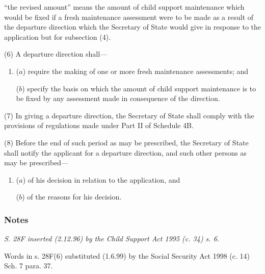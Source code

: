 \documentclass[a4paper]{article}
\newcommand\amendment[1]{\subsubsection*{Notes}{\itshape\frenchspacing\footnotesize #1 \par}}
\begin{document}
{\begin{enumerate}
“the revised amount” means the amount of child support maintenance which would be fixed if a fresh maintenance assessment were to be made as a result of the departure direction which the Secretary of State would give in response to the application but for subsection (4).
\end{enumerate}

(6) A departure direction shall—
\begin{enumerate}\item[]
($a$) require 
the making of
one or more fresh maintenance assessments; and

($b$) specify the basis on which the amount of child support maintenance is to be fixed by any assessment made in consequence of the direction.
\end{enumerate}

(7) In giving a departure direction, the Secretary of State shall comply with the provisions of regulations made under Part II of Schedule 4B.

(8) Before the end of such period as may be prescribed, the Secretary of State shall notify the applicant for a departure direction, and such other persons as may be prescribed—
\begin{enumerate}\item[]
($a$) of his decision in relation to the application, and

($b$) of the reasons for his decision.
\end{enumerate}

\amendment{
S. 28F inserted (2.12.96) by the Child Support Act 1995 (c. 34) s. 6.

Words in s. 28F(6) substituted (1.6.99) by the Social Security Act 1998 (c. 14) Sch. 7 para. 37.
}
}
\end{document}
